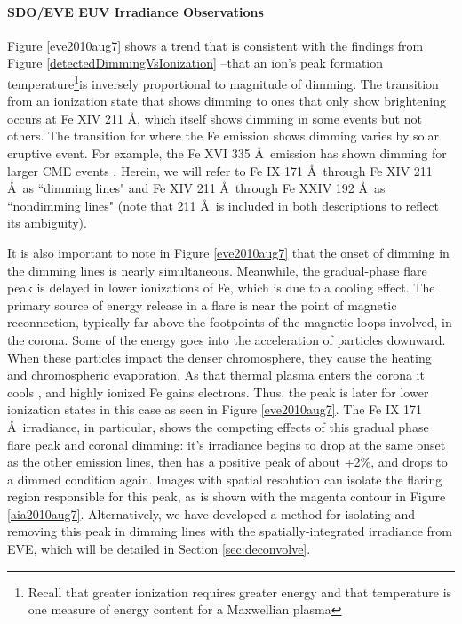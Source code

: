 \paragraph{SDO/EVE EUV Irradiance Observations}
Figure \ref{eve2010aug7} shows a trend that is consistent with the findings from Figure \ref{detectedDimmingVsIonization} --that an ion's peak formation temperature\footnote{Recall that greater ionization requires greater energy and that temperature is one measure of energy content for a Maxwellian plasma}is inversely proportional to magnitude of dimming. The transition from an ionization state that shows dimming to ones that only show brightening occurs at Fe XIV 211 \AA, which itself shows dimming in some events but not others. The transition for where the Fe emission shows dimming varies by solar eruptive event. For example, the Fe XVI 335 \AA\ emission has shown dimming for larger CME events \citep{Woods2011}. Herein, we will refer to Fe IX 171 \AA\ through Fe XIV 211 \AA\ as ``dimming lines" and Fe XIV 211 \AA\ through Fe XXIV 192 \AA\ as ``nondimming lines" (note that 211 \AA\ is included in both descriptions to reflect its ambiguity).

It is also important to note in Figure \ref{eve2010aug7} that the onset of dimming in the dimming lines is nearly simultaneous. Meanwhile, the gradual-phase flare peak is delayed in lower ionizations of Fe, which is due to a cooling effect. The primary source of energy release in a flare is near the point of magnetic reconnection, typically far above the footpoints of the magnetic loops involved, in the corona. Some of the energy goes into the acceleration of particles downward. When these particles impact the denser chromosphere, they cause the heating and chromospheric evaporation. As that thermal plasma enters the corona it cools \citep{Fletcher2011}, and highly ionized Fe gains electrons. Thus, the peak is later for lower ionization states in this case as seen in Figure \ref{eve2010aug7}. The Fe IX 171 \AA\ irradiance, in particular, shows the competing effects of this gradual phase flare peak and coronal dimming: it's irradiance begins to drop at the same onset as the other emission lines, then has a positive peak of about +2\%, and drops to a dimmed condition again. Images with spatial resolution can isolate the flaring region responsible for this peak, as is shown with the magenta contour in Figure \ref{aia2010aug7}. Alternatively, we have developed a method for isolating and removing this peak in dimming lines with the spatially-integrated irradiance from EVE, which will be detailed in Section \ref{sec:deconvolve}. 

